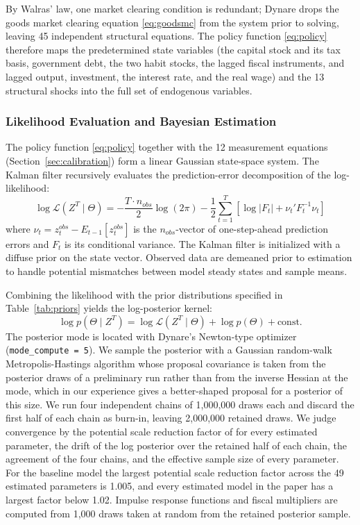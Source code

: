 \documentclass[article,11pt,letterpaper,fleqn]{article}
\theoremstyle{definition}
\numberwithin{equation}{section}
\begin{document}
By Walras' law, one market clearing condition is redundant; Dynare drops the goods market clearing equation \eqref{eq:goodsmc} from the system prior to solving, leaving 45 independent structural equations. The policy function \eqref{eq:policy} therefore maps the predetermined state variables (the capital stock and its tax basis, government debt, the two habit stocks, the lagged fiscal instruments, and lagged output, investment, the interest rate, and the real wage) and the 13 structural shocks into the full set of endogenous variables.

\subsubsection{Likelihood Evaluation and Bayesian Estimation}

The policy function \eqref{eq:policy} together with the 12 measurement equations (Section~\ref{sec:calibration}) form a linear Gaussian state-space system. The Kalman filter recursively evaluates the prediction-error decomposition of the log-likelihood:
\begin{equation}\label{eq:likelihood}
\log \mathcal{L}(Z^T \mid \Theta) = -\frac{T \cdot n_{obs}}{2}\log(2\pi) - \frac{1}{2}\sum_{t=1}^{T}\!\left[\log|F_t| + \nu_t' F_t^{-1} \nu_t\right]
\end{equation}
where $\nu_t = z_t^{obs} - E_{t-1}[z_t^{obs}]$ is the $n_{obs}$-vector of one-step-ahead prediction errors and $F_t$ is its conditional variance. The Kalman filter is initialized with a diffuse prior on the state vector. Observed data are demeaned prior to estimation to handle potential mismatches between model steady states and sample means.

Combining the likelihood with the prior distributions specified in Table~\ref{tab:priors} yields the log-posterior kernel:
\begin{equation}\label{eq:posterior}
\log p(\Theta \mid Z^T) = \log\mathcal{L}(Z^T \mid \Theta) + \log p(\Theta) + \text{const.}
\end{equation}
The posterior mode is located with Dynare's Newton-type optimizer (\texttt{mode\_compute = 5}). We sample the posterior with a Gaussian random-walk Metropolis-Hastings algorithm whose proposal covariance is taken from the posterior draws of a preliminary run rather than from the inverse Hessian at the mode, which in our experience gives a better-shaped proposal for a posterior of this size. We run four independent chains of 1{,}000{,}000 draws each and discard the first half of each chain as burn-in, leaving 2{,}000{,}000 retained draws. We judge convergence by the potential scale reduction factor of \citet{GelmanRubin1992} for every estimated parameter, the drift of the log posterior over the retained half of each chain, the agreement of the four chains, and the effective sample size of every parameter. For the baseline model the largest potential scale reduction factor across the 49 estimated parameters is 1.005, and every estimated model in the paper has a largest factor below 1.02. Impulse response functions and fiscal multipliers are computed from 1{,}000 draws taken at random from the retained posterior sample.
\end{document}
